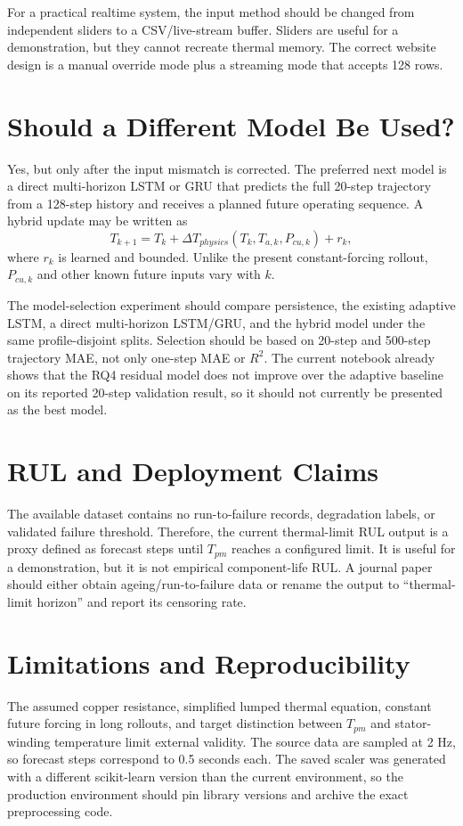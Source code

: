 \documentclass[conference]{IEEEtran}
\begin{document}
For a practical realtime system, the input method should be changed from
independent sliders to a CSV/live-stream buffer. Sliders are useful for a
demonstration, but they cannot recreate thermal memory. The correct website
design is a manual override mode plus a streaming mode that accepts 128 rows.

\section{Should a Different Model Be Used?}
Yes, but only after the input mismatch is corrected. The preferred next model
is a direct multi-horizon LSTM or GRU that predicts the full 20-step trajectory
from a 128-step history and receives a planned future operating sequence. A
hybrid update may be written as
\begin{equation}
 T_{k+1}=T_k+\Delta T_{physics}(T_k,T_{a,k},P_{cu,k})
             +r_k,
\end{equation}
where $r_k$ is learned and bounded. Unlike the present constant-forcing
rollout, $P_{cu,k}$ and other known future inputs vary with $k$.

The model-selection experiment should compare persistence, the existing
adaptive LSTM, a direct multi-horizon LSTM/GRU, and the hybrid model under the
same profile-disjoint splits. Selection should be based on 20-step and
500-step trajectory MAE, not only one-step MAE or $R^2$. The current notebook
already shows that the RQ4 residual model does not improve over the adaptive
baseline on its reported 20-step validation result, so it should not currently
be presented as the best model.

\section{RUL and Deployment Claims}
The available dataset contains no run-to-failure records, degradation labels,
or validated failure threshold. Therefore, the current thermal-limit RUL
output is a proxy defined as forecast steps until $T_{pm}$ reaches a configured
limit. It is useful for a demonstration, but it is not empirical component-life
RUL. A journal paper should either obtain ageing/run-to-failure data or rename
the output to ``thermal-limit horizon'' and report its censoring rate.

\section{Limitations and Reproducibility}
The assumed copper resistance, simplified lumped thermal equation, constant
future forcing in long rollouts, and target distinction between $T_{pm}$ and
stator-winding temperature limit external validity. The source data are sampled
at 2 Hz, so forecast steps correspond to 0.5 seconds each. The saved scaler was
generated with a different scikit-learn version than the current environment,
so the production environment should pin library versions and archive the exact
preprocessing code.
\end{document}
